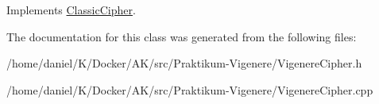 Implements \hyperlink{classClassicCipher_aab1fac1b6e54aee2fb34a65cf4cb917f}{Classic\+Cipher}.



The documentation for this class was generated from the following files\+:\begin{DoxyCompactItemize}
\item 
/home/daniel/\+K/\+Docker/\+A\+K/src/\+Praktikum-\/\+Vigenere/Vigenere\+Cipher.\+h\item 
/home/daniel/\+K/\+Docker/\+A\+K/src/\+Praktikum-\/\+Vigenere/Vigenere\+Cipher.\+cpp\end{DoxyCompactItemize}
